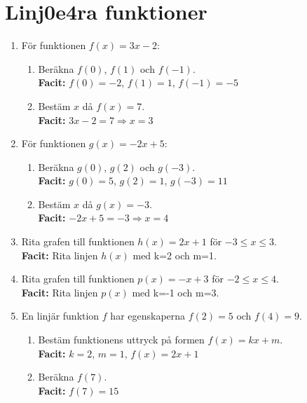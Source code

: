 \documentclass[a4paper,11pt]{article}
\begin{document}
\section*{Linj 0e4ra funktioner}

\begin{enumerate}[label=\textbf{\arabic*.}]
    \item För funktionen $f(x) = 3x - 2$:
    \begin{enumerate}[label=\alph*)]
        \item Beräkna $f(0)$, $f(1)$ och $f(-1)$.
        \\ \textbf{Facit:} $f(0) = -2$, $f(1) = 1$, $f(-1) = -5$
        \item Bestäm $x$ då $f(x) = 7$.
        \\ \textbf{Facit:} $3x-2=7 \Rightarrow x=3$
    \end{enumerate}
    
    \item För funktionen $g(x) = -2x + 5$:
    \begin{enumerate}[label=\alph*)]
        \item Beräkna $g(0)$, $g(2)$ och $g(-3)$.
        \\ \textbf{Facit:} $g(0)=5$, $g(2)=1$, $g(-3)=11$
        \item Bestäm $x$ då $g(x) = -3$.
        \\ \textbf{Facit:} $-2x+5=-3 \Rightarrow x=4$
    \end{enumerate}
    
    \item Rita grafen till funktionen $h(x) = 2x + 1$ för $-3 \leq x \leq 3$.
    \\ \textbf{Facit:} Rita linjen $h(x)$ med k=2 och m=1.
    
    \item Rita grafen till funktionen $p(x) = -x + 3$ för $-2 \leq x \leq 4$.
    \\ \textbf{Facit:} Rita linjen $p(x)$ med k=-1 och m=3.
    
    \item En linjär funktion $f$ har egenskaperna $f(2) = 5$ och $f(4) = 9$.
    \begin{enumerate}[label=\alph*)]
        \item Bestäm funktionens uttryck på formen $f(x) = kx + m$.
        \\ \textbf{Facit:} $k=2$, $m=1$, $f(x)=2x+1$
        \item Beräkna $f(7)$.
        \\ \textbf{Facit:} $f(7)=15$
    \end{enumerate}
    

\end{enumerate}
\end{document}
